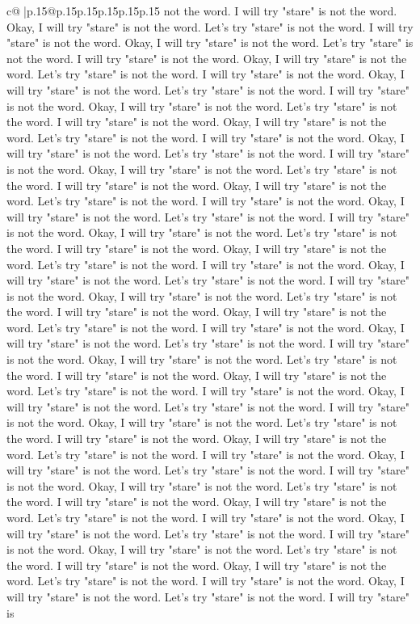 \documentclass{article}
\begin{document}
{\begin{supertabular}{c@{$\;$}|p{.15\linewidth}@{}p{.15\linewidth}p{.15\linewidth}p{.15\linewidth}p{.15\linewidth}p{.15\linewidth}}
{{{not the word. I will try "stare" is not the word. Okay, I will try "stare" is not the word. Let's try "stare" is not the word. I will try "stare" is not the word. Okay, I will try "stare" is not the word. Let's try "stare" is not the word. I will try "stare" is not the word. Okay, I will try "stare" is not the word. Let's try "stare" is not the word. I will try "stare" is not the word. Okay, I will try "stare" is not the word. Let's try "stare" is not the word. I will try "stare" is not the word. Okay, I will try "stare" is not the word. Let's try "stare" is not the word. I will try "stare" is not the word. Okay, I will try "stare" is not the word. Let's try "stare" is not the word. I will try "stare" is not the word. Okay, I will try "stare" is not the word. Let's try "stare" is not the word. I will try "stare" is not the word. Okay, I will try "stare" is not the word. Let's try "stare" is not the word. I will try "stare" is not the word. Okay, I will try "stare" is not the word. Let's try "stare" is not the word. I will try "stare" is not the word. Okay, I will try "stare" is not the word. Let's try "stare" is not the word. I will try "stare" is not the word. Okay, I will try "stare" is not the word. Let's try "stare" is not the word. I will try "stare" is not the word. Okay, I will try "stare" is not the word. Let's try "stare" is not the word. I will try "stare" is not the word. Okay, I will try "stare" is not the word. Let's try "stare" is not the word. I will try "stare" is not the word. Okay, I will try "stare" is not the word. Let's try "stare" is not the word. I will try "stare" is not the word. Okay, I will try "stare" is not the word. Let's try "stare" is not the word. I will try "stare" is not the word. Okay, I will try "stare" is not the word. Let's try "stare" is not the word. I will try "stare" is not the word. Okay, I will try "stare" is not the word. Let's try "stare" is not the word. I will try "stare" is not the word. Okay, I will try "stare" is not the word. Let's try "stare" is not the word. I will try "stare" is not the word. Okay, I will try "stare" is not the word. Let's try "stare" is not the word. I will try "stare" is not the word. Okay, I will try "stare" is not the word. Let's try "stare" is not the word. I will try "stare" is not the word. Okay, I will try "stare" is not the word. Let's try "stare" is not the word. I will try "stare" is not the word. Okay, I will try "stare" is not the word. Let's try "stare" is not the word. I will try "stare" is not the word. Okay, I will try "stare" is not the word. Let's try "stare" is not the word. I will try "stare" is not the word. Okay, I will try "stare" is not the word. Let's try "stare" is not the word. I will try "stare" is not the word. Okay, I will try "stare" is not the word. Let's try "stare" is not the word. I will try "stare" is not the word. Okay, I will try "stare" is not the word. Let's try "stare" is not the word. I will try "stare" is not the word. Okay, I will try "stare" is not the word. Let's try "stare" is not the word. I will try "stare" is not the word. Okay, I will try "stare" is not the word. Let's try "stare" is not the word. I will try "stare" is }}}
\end{supertabular}}
\end{document}
